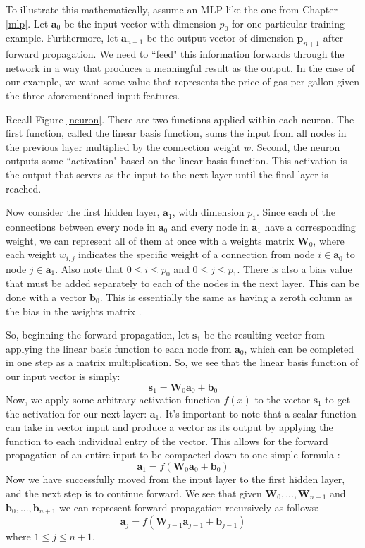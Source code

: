 \documentclass[12pt]{report}
\begin{document}
To illustrate this mathematically, assume an MLP like the one from Chapter \ref{mlp}.
Let $\textbf{a}_0$ be the input vector with dimension $p_0$ for one particular training example.
Furthermore, let $\textbf{a}_{n+1}$ be the output vector of dimension $\textbf{p}_{n+1}$ after forward propagation. We need to ``feed" this information forwards through the network in a way that produces a meaningful result as the output. In the case of our example, we want some value that represents the price of gas per gallon given the three aforementioned input features.

Recall Figure \ref{neuron}. There are two functions applied within each neuron. The first function, called the linear basis function, sums the input from all nodes in the previous layer multiplied by the connection weight $w$. Second, the neuron outputs some ``activation" based on the linear basis function. This activation is the output that serves as the input to the next layer until the final layer is reached.

Now consider the first hidden layer, $\textbf{a}_1$, with dimension $p_1$.
Since each of the connections between every node in $\textbf{a}_0$ and every node in $\textbf{a}_1$ have a corresponding weight, we can represent all of them at once with a weights matrix $\textbf{W}_0$, where each weight $w_{i,j}$ indicates the specific weight of a connection from node $i \in \textbf{a}_0$ to node $j \in \textbf{a}_1$. Also note that $0 \leq i \leq p_0$ and $0 \leq j \leq p_1$.
There is also a bias value that must be added separately to each of the nodes in the next layer. This can be done with a vector $\textbf{b}_0$. This is essentially the same as having a zeroth column as the bias in the weights matrix \cite{krose1996introduction}.

So, beginning the forward propagation, let $\textbf{s}_1$ be the resulting vector from applying the linear basis function to each node from $\textbf{a}_0$, which can be completed in one step as a matrix multiplication. So, we see that the linear basis function of our input vector is simply:
$$\textbf{s}_1 = \textbf{W}_0 \textbf{a}_0 + \textbf{b}_0$$
Now, we apply some arbitrary activation function $f(x)$ to the vector $\textbf{s}_1$ to get the activation for our next layer: $\textbf{a}_1$.
It's important to note that a scalar function can take in vector input and produce a vector as its output by applying the function to each individual entry of the vector.
This allows for the forward propagation of an entire input to be compacted down to one simple formula \cite{youtube_2017}:
$$\textbf{a}_1 = f(\textbf{W}_0 \textbf{a}_0 + \textbf{b}_0)$$
Now we have successfully moved from the input layer to the first hidden layer, and the next step is to continue forward. We see that given $\textbf{W}_0, ... ,\textbf{W}_{n+1}$ and $\textbf{b}_0, ... ,\textbf{b}_{n+1}$ we can represent forward propagation recursively as follows:
$$\textbf{a}_j = f(\textbf{W}_{j-1} \textbf{a}_{j-1} + \textbf{b}_{j-1})$$
where $1 \leq j \leq n+1$.
\end{document}

